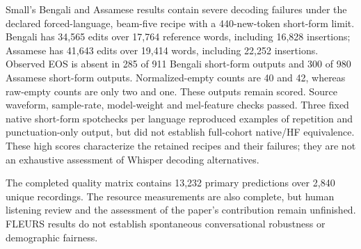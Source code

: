 \documentclass[11pt]{article}
\begin{document}
Small's Bengali and Assamese results contain severe decoding failures under the declared forced-language, beam-five recipe with a 440-new-token short-form limit. Bengali has 34,565 edits over 17,764 reference words, including 16,828 insertions; Assamese has 41,643 edits over 19,414 words, including 22,252 insertions. Observed EOS is absent in 285 of 911 Bengali short-form outputs and 300 of 980 Assamese short-form outputs. Normalized-empty counts are 40 and 42, whereas raw-empty counts are only two and one. These outputs remain scored. Source waveform, sample-rate, model-weight and mel-feature checks passed. Three fixed native short-form spotchecks per language reproduced examples of repetition and punctuation-only output, but did not establish full-cohort native/HF equivalence. These high scores characterize the retained recipes and their failures; they are not an exhaustive assessment of Whisper decoding alternatives.

The completed quality matrix contains 13,232 primary predictions over 2,840 unique recordings. The resource measurements are also complete, but human listening review and the assessment of the paper's contribution remain unfinished. FLEURS results do not establish spontaneous conversational robustness or demographic fairness.
\end{document}
